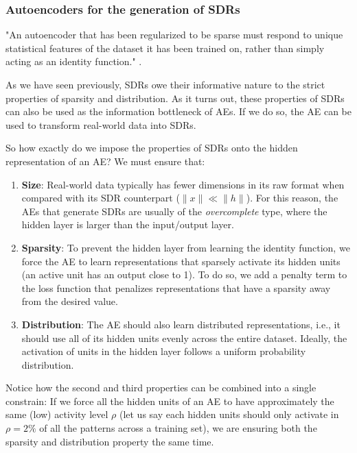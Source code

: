 \documentclass[runningheads]{llncs}
\begin{document}
\subsubsection{Autoencoders for the generation of SDRs}
\label{sec:prescriptions_AEs_sparse}

"An autoencoder that has been regularized to be sparse must
respond to unique statistical features of the dataset it has been trained on, rather than simply acting as an identity function." \cite{bengio2017deep}.

As we have seen previously, SDRs owe their informative nature to the strict properties of sparsity and distribution. As it turns out, these properties of SDRs can also be used as the information bottleneck of AEs. If we do so, the AE can be used to transform real-world data into SDRs.

So how exactly do we impose the properties of SDRs onto the hidden representation of an AE? We must ensure that:
\begin{enumerate}
    \item \textbf{Size}: Real-world data typically has fewer dimensions in its raw format when compared with its SDR counterpart ($\|x\| \ll \|h\|$). For this reason, the AEs that generate SDRs are usually of the \textit{overcomplete} type, where the hidden layer is larger than the input/output layer.
    
    \item \textbf{Sparsity}: To prevent the hidden layer from learning the identity function, we force the AE to learn representations that sparsely activate its hidden units (an active unit has an output close to 1). To do so, we add a penalty term to the loss function that penalizes representations that have a sparsity away from the desired value.
    
    \item \textbf{Distribution}: The AE should also learn distributed representations, i.e., it should use all of its hidden units evenly across the entire dataset. Ideally, the activation of units in the hidden layer follows a uniform probability distribution.
\end{enumerate}

Notice how the second and third properties can be combined into a single constrain: If we force all the hidden units of an AE to have approximately the same (low) activity level $\rho$ (let us say each hidden units should only activate in $\rho=2\%$ of all the patterns across a training set), we are ensuring both the sparsity and distribution property the same time.
\end{document}
